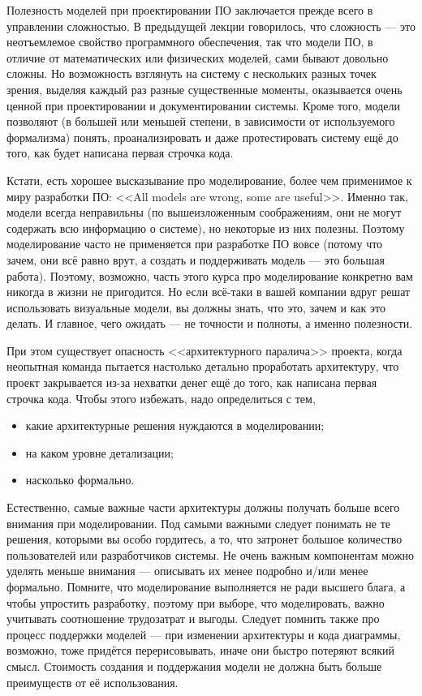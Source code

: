 \documentclass{../../text-style}
\begin{document}
Полезность моделей при проектировании ПО заключается прежде всего в управлении сложностью. В предыдущей лекции говорилось, что сложность --- это неотъемлемое свойство программного обеспечения, так что модели ПО, в отличие от математических или физических моделей, сами бывают довольно сложны. Но возможность взглянуть на систему с нескольких разных точек зрения, выделяя каждый раз разные существенные моменты, оказывается очень ценной при проектировании и документировании системы. Кроме того, модели позволяют (в большей или меньшей степени, в зависимости от используемого формализма) понять, проанализировать и даже протестировать систему ещё до того, как будет написана первая строчка кода.

Кстати, есть хорошее высказывание про моделирование, более чем применимое к миру разработки ПО: <<All models are wrong, some are useful>>. Именно так, модели всегда неправильны (по вышеизложенным соображениям, они не могут содержать всю информацию о системе), но некоторые из них полезны. Поэтому моделирование часто не применяется при разработке ПО вовсе (потому что зачем, они всё равно врут, а создать и поддерживать модель --- это большая работа). Поэтому, возможно, часть этого курса про моделирование конкретно вам никогда в жизни не пригодится. Но если всё-таки в вашей компании вдруг решат использовать визуальные модели, вы должны знать, что это, зачем и как это делать. И главное, чего ожидать --- не точности и полноты, а именно полезности.

При этом существует опасность <<архитектурного паралича>> проекта, когда неопытная команда пытается настолько детально проработать архитектуру, что проект закрывается из-за нехватки денег ещё до того, как написана первая строчка кода. Чтобы этого избежать, надо определиться с тем,

\begin{itemize}
    \item какие архитектурные решения нуждаются в моделировании;
    \item на каком уровне детализации;
    \item насколько формально.
\end{itemize}

Естественно, самые важные части архитектуры должны получать больше всего внимания при моделировании. Под самыми важными следует понимать не те решения, которыми вы особо гордитесь, а то, что затронет большое количество пользователей или разработчиков системы. Не очень важным компонентам можно уделять меньше внимания --- описывать их менее подробно и/или менее формально. Помните, что моделирование выполняется не ради высшего блага, а чтобы упростить разработку, поэтому при выборе, что моделировать, важно учитывать соотношение трудозатрат и выгоды. Следует помнить также про процесс поддержки моделей --- при изменении архитектуры и кода диаграммы, возможно, тоже придётся перерисовывать, иначе они быстро потеряют всякий смысл. Стоимость создания и поддержания модели не должна быть больше преимуществ от её использования.
\end{document}
